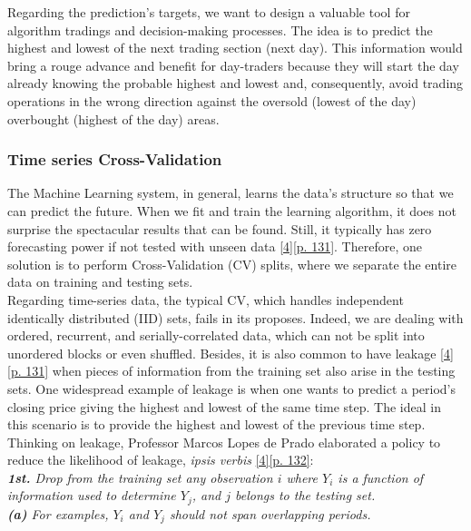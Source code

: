 Regarding the prediction's targets, we want to design a valuable tool for algorithm tradings and decision-making processes. The idea is to predict the highest and lowest of the next trading section (next day). This information would bring a rouge advance and benefit for day-traders because they will start the day already knowing the probable highest and lowest and, consequently, avoid trading operations in the wrong direction against the oversold (lowest of the day) overbought (highest of the day) areas.

\subsubsection{Time series Cross-Validation}
\label{chap:Time series Cross-Validation}

\quad The Machine Learning system, in general, learns the data's structure so that we can predict the future. When we fit and train the learning algorithm, it does not surprise the spectacular results that can be found. Still, it typically has zero forecasting power if not tested with unseen data \hyperref[Bib:Lopez de Prado]{[4][p. 131]}. Therefore, one solution is to perform Cross-Validation (CV) splits, where we separate the entire data on training and testing sets.\\

Regarding time-series data, the typical CV, which handles independent identically distributed (IID) sets, fails in its proposes. Indeed, we are dealing with ordered, recurrent, and serially-correlated data, which can not be split into unordered blocks or even shuffled. Besides, it is also common to have leakage \hyperref[Bib:Lopez de Prado]{[4][p. 131]} when pieces of information from the training set also arise in the testing sets. One widespread example of leakage is when one wants to predict a period's closing price giving the highest and lowest of the same time step. The ideal in this scenario is to provide the highest and lowest of the previous time step. Thinking on leakage, Professor Marcos Lopes de Prado elaborated a policy to reduce the likelihood of leakage, \textit{ipsis verbis} \hyperref[Bib:Lopez de Prado]{[4][p. 132]}:\\

\noindent \textit{\textbf{1st.} Drop from the training set any observation $i$ where $Y_i$ is a function of information used to determine $Y_j$, and $j$ belongs to the testing set.}\\

\qquad \textit{\textbf{(a)} For examples, $Y_i$ and $Y_j$ should not span overlapping periods.}\\

